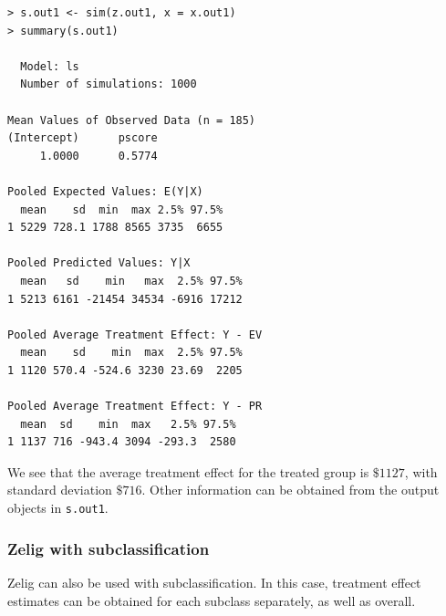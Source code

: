 \documentclass[oneside,letterpaper,titlepage]{article}
\begin{document}
\begin{verbatim}
> s.out1 <- sim(z.out1, x = x.out1)
> summary(s.out1)

  Model: ls 
  Number of simulations: 1000 

Mean Values of Observed Data (n = 185) 
(Intercept)      pscore 
     1.0000      0.5774 

Pooled Expected Values: E(Y|X)
  mean    sd  min  max 2.5% 97.5%
1 5229 728.1 1788 8565 3735  6655

Pooled Predicted Values: Y|X
  mean   sd    min   max  2.5% 97.5%
1 5213 6161 -21454 34534 -6916 17212

Pooled Average Treatment Effect: Y - EV
  mean    sd    min  max  2.5% 97.5%
1 1120 570.4 -524.6 3230 23.69  2205

Pooled Average Treatment Effect: Y - PR
  mean  sd    min  max   2.5% 97.5%
1 1137 716 -943.4 3094 -293.3  2580
\end{verbatim}

We see that the average treatment effect for the treated group is
$\$1127$, with standard deviation $\$716$.  Other information can be
obtained from the output objects in {\tt s.out1}.

\subsubsection{Zelig with subclassification}
Zelig can also be used with subclassification.  In this case,
treatment effect estimates can be obtained for each subclass separately, as
well as overall.
\end{document}
